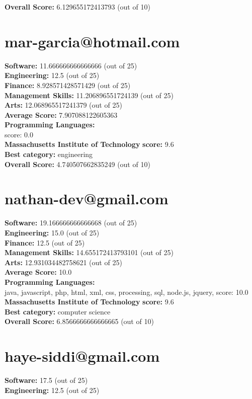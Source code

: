 \documentclass{article}
\begin{document}
\textbf{Overall Score: }6.129655172413793 (out of 10)\section{mar-garcia@hotmail.com}
\textbf{Software:} 11.666666666666666 (out of 25)\\
\textbf{Engineering: } 12.5 (out of 25)\\
\textbf{Finance:} 8.928571428571429 (out of 25)\\
\textbf{Management Skills:} 11.206896551724139 (out of 25)\\
\textbf{Arts:} 12.068965517241379 (out of 25)\\
\textbf{Average Score: } 7.907088122605363\\
\textbf{Programming Languages:} \\
score: 0.0\\
\textbf{Massachusetts Institute of Technology} \textbf{score:} 9.6\\
\textbf{Best category: } engineering\\
\textbf{Overall Score: }4.740507662835249 (out of 10)\section{nathan-dev@gmail.com}
\textbf{Software:} 19.166666666666668 (out of 25)\\
\textbf{Engineering: } 15.0 (out of 25)\\
\textbf{Finance:} 12.5 (out of 25)\\
\textbf{Management Skills:} 14.655172413793101 (out of 25)\\
\textbf{Arts:} 12.931034482758621 (out of 25)\\
\textbf{Average Score: } 10.0\\
\textbf{Programming Languages:} \\
java, javascript, php, html, xml, css, processing, sql, node.js, jquery, score: 10.0\\
\textbf{Massachusetts Institute of Technology} \textbf{score:} 9.6\\
\textbf{Best category: } computer science\\
\textbf{Overall Score: }6.8566666666666665 (out of 10)\section{haye-siddi@gmail.com}
\textbf{Software:} 17.5 (out of 25)\\
\textbf{Engineering: } 12.5 (out of 25)\\
\end{document}
